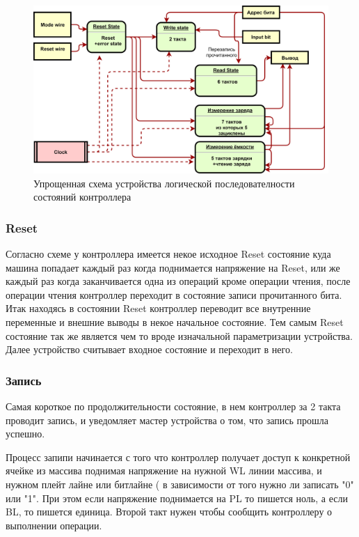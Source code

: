 \documentclass[a4paper,12pt]{article} %
\begin{document}
\begin{figure}[H]
\centering
  \includegraphics[width=\linewidth]{state.png}
  \caption{Упрощенная схема устройства логической последователности состояний контроллера}%
  \label{stateFig}
\end{figure}

\subsubsection{Reset}
Согласно схеме у контроллера имеется некое исходное Reset состояние куда машина попадает каждый раз когда поднимается напряжение на Reset, или же каждый раз когда заканчивается одна из операций кроме операции чтения, после операции чтения контроллер переходит в состояние записи прочитанного бита. Итак находясь в состоянии Reset контроллер переводит все внутренние переменные и внешние выводы в некое начальное состояние. Тем самым Reset состояние так же является чем то вроде изначальной параметризации устройства. Далее устройство считывает входное состояние и переходит в него. 




\subsubsection{Запись} Самая короткое по продолжительности состояние, в нем контроллер за 2 такта проводит запись, и уведомляет мастер устройства о том, что запись прошла успешно.

Процесс запипи начинается с того что контроллер получает доступ к конкретной ячейке из массива поднимая напряжение на нужной WL линии массива, и нужном плейт лайне или битлайне ( в зависимости от того нужно ли записать "0" или "1". При этом если напряжение поднимается на PL то пишется ноль, а если BL, то пишется единица. Второй такт нужен чтобы сообщить контроллеру о выполнении операции. 
\end{document}
